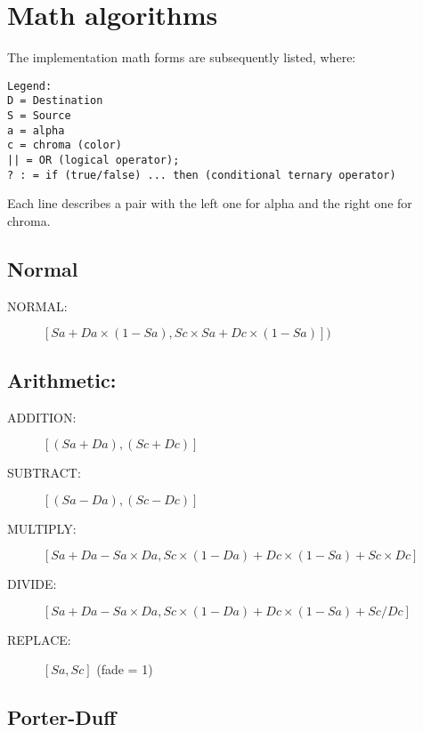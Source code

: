 \section{Math algorithms}%
\label{sec:math_algorithms}

The implementation math forms are subsequently listed, where:

\vspace{2ex}
\begin{lstlisting}[style=sh]
Legend:
D = Destination
S = Source
a = alpha
c = chroma (color)
|| = OR (logical operator);
? : = if (true/false) ... then (conditional ternary operator)
\end{lstlisting}

Each line describes a pair with the left one for alpha and the right one for chroma.

\subsection*{Normal}%
\label{sub:normal}

\begin{description}
    \item[NORMAL:] $[Sa + Da \times (1 - Sa), Sc \times Sa + Dc \times(1 - Sa)])$
\end{description}

\subsection*{Arithmetic:}%
\label{sub:arithmetic}

\begin{description}
    \item[ADDITION:] $[(Sa + Da), (Sc + Dc)]$
    \item[SUBTRACT:] $[(Sa - Da), (Sc - Dc)]$
    \item[MULTIPLY:] $[Sa + Da - Sa \times Da, Sc\times(1 - Da) + Dc\times (1 - Sa) + Sc \times Dc]$
    \item[DIVIDE:] $[Sa + Da - Sa \times Da, Sc\times(1 - Da) + Dc \times (1 - Sa) + Sc/Dc]$
    \item[REPLACE:] $[Sa, Sc]$ (fade = 1)
\end{description}

\subsection*{Porter-Duff}%
\label{sub:porter-duff}

